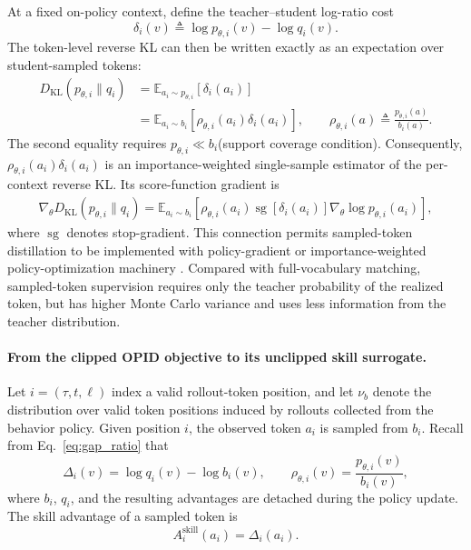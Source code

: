 At a fixed on-policy context, define the teacher--student log-ratio cost
\begin{equation*}
 \delta_i(v)
 \triangleq
 \log p_{\theta,i}(v)-\log q_i(v).
\end{equation*}
The token-level reverse KL can then be written exactly as an expectation over
student-sampled tokens:
\begin{equation*}
\begin{aligned}
 D_{\mathrm{KL}}(p_{\theta,i}\|q_i)
 &=
 \mathbb E_{a_i\sim p_{\theta,i}}
 \left[
 \delta_i(a_i)
 \right]\\
 &=
 \mathbb E_{a_i\sim b_i}
 \left[
 \rho_{\theta,i}(a_i)\delta_i(a_i)
 \right],
 \qquad
 \rho_{\theta,i}(a)
 \triangleq
 \frac{p_{\theta,i}(a)}{b_i(a)}.
\end{aligned}
\end{equation*}
The second equality requires \(p_{\theta,i}\ll b_i\)(support coverage condition). Consequently,
\(\rho_{\theta,i}(a_i)\delta_i(a_i)\) is an importance-weighted
single-sample estimator of the per-context reverse KL. Its score-function
gradient is
\begin{equation*}
\begin{aligned}
 \nabla_\theta
 D_{\mathrm{KL}}(p_{\theta,i}\|q_i)
 =
 \mathbb E_{a_i\sim b_i}
 \left[
 \rho_{\theta,i}(a_i)
 \operatorname{sg}\!\left[\delta_i(a_i)\right]
 \nabla_\theta\log p_{\theta,i}(a_i)
 \right],
\end{aligned}
\end{equation*}
where \(\operatorname{sg}\) denotes stop-gradient. This connection permits
sampled-token distillation to be implemented with policy-gradient or
importance-weighted policy-optimization machinery
\citep{gu2024minillm,lu2025onpolicydistillation,oh2026kl}.
Compared with full-vocabulary matching, sampled-token supervision requires
only the teacher probability of the realized token, but has higher
Monte Carlo variance and uses less information from the teacher distribution.


\paragraph{From the clipped OPID objective to its unclipped skill
surrogate.}
Let \(i=(\tau,t,\ell)\) index a valid rollout-token position, and let
\(\nu_b\) denote the distribution over valid token positions induced by
rollouts collected from the behavior policy. Given position \(i\), the
observed token \(a_i\) is sampled from \(b_i\). Recall from
Eq.~\ref{eq:gap_ratio} that
\[
 \Delta_i(v)
 =
 \log q_i(v)-\log b_i(v),
 \qquad
 \rho_{\theta,i}(v)
 =
 \frac{p_{\theta,i}(v)}{b_i(v)},
\]
where \(b_i\), \(q_i\), and the resulting advantages are detached during
the policy update. The skill advantage of a sampled token is
\begin{equation*}
 A_i^{\mathrm{skill}}(a_i)
 =
 \Delta_i(a_i).
\end{equation*}

